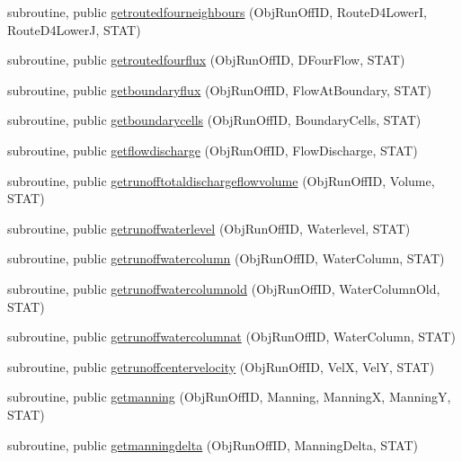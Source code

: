 \begin{DoxyCompactItemize}
\item 
subroutine, public \mbox{\hyperlink{namespacemodulerunoff_a012d41440fbbe25a6de0417a150502fd}{getroutedfourneighbours}} (Obj\+Run\+Off\+ID, Route\+D4\+LowerI, Route\+D4\+LowerJ, S\+T\+AT)
\item 
subroutine, public \mbox{\hyperlink{namespacemodulerunoff_a8e2e0bbd121e81c889fd2cd186c45b5c}{getroutedfourflux}} (Obj\+Run\+Off\+ID, D\+Four\+Flow, S\+T\+AT)
\item 
subroutine, public \mbox{\hyperlink{namespacemodulerunoff_aa5c3e304953e0e305461bb0ef472e0f8}{getboundaryflux}} (Obj\+Run\+Off\+ID, Flow\+At\+Boundary, S\+T\+AT)
\item 
subroutine, public \mbox{\hyperlink{namespacemodulerunoff_a94d1c021f061e9cfa1f07c3845541525}{getboundarycells}} (Obj\+Run\+Off\+ID, Boundary\+Cells, S\+T\+AT)
\item 
subroutine, public \mbox{\hyperlink{namespacemodulerunoff_a35dbdf0f3737830c01b78496fc043851}{getflowdischarge}} (Obj\+Run\+Off\+ID, Flow\+Discharge, S\+T\+AT)
\item 
subroutine, public \mbox{\hyperlink{namespacemodulerunoff_aa4377dd8080b614590e0609f019f9764}{getrunofftotaldischargeflowvolume}} (Obj\+Run\+Off\+ID, Volume, S\+T\+AT)
\item 
subroutine, public \mbox{\hyperlink{namespacemodulerunoff_a739d861fb3d51996841a644f1567506e}{getrunoffwaterlevel}} (Obj\+Run\+Off\+ID, Waterlevel, S\+T\+AT)
\item 
subroutine, public \mbox{\hyperlink{namespacemodulerunoff_a2f62616fa000a8f027d3557454de9b24}{getrunoffwatercolumn}} (Obj\+Run\+Off\+ID, Water\+Column, S\+T\+AT)
\item 
subroutine, public \mbox{\hyperlink{namespacemodulerunoff_a4718c4b469bb2480c20b88afa22ebc29}{getrunoffwatercolumnold}} (Obj\+Run\+Off\+ID, Water\+Column\+Old, S\+T\+AT)
\item 
subroutine, public \mbox{\hyperlink{namespacemodulerunoff_a6f2a352071be64f678c58f0707749d4f}{getrunoffwatercolumnat}} (Obj\+Run\+Off\+ID, Water\+Column, S\+T\+AT)
\item 
subroutine, public \mbox{\hyperlink{namespacemodulerunoff_af29a57ef10a724fc9c8e0a4f1f22339e}{getrunoffcentervelocity}} (Obj\+Run\+Off\+ID, VelX, VelY, S\+T\+AT)
\item 
subroutine, public \mbox{\hyperlink{namespacemodulerunoff_a2cad42fe7c6c24a46f9a75f3528e8abb}{getmanning}} (Obj\+Run\+Off\+ID, Manning, ManningX, ManningY, S\+T\+AT)
\item 
subroutine, public \mbox{\hyperlink{namespacemodulerunoff_a9ca63f5612ab734b77497c2eca2c05bd}{getmanningdelta}} (Obj\+Run\+Off\+ID, Manning\+Delta, S\+T\+AT)

\end{DoxyCompactItemize}
